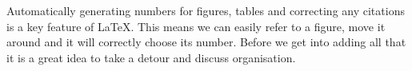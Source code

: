 Automatically generating numbers for figures, tables and correcting any citations is a key feature of \LaTeX.
This means we can easily refer to a figure, move it around and it will correctly choose its number.
Before we get into adding all that it is a great idea to take a detour and discuss organisation.